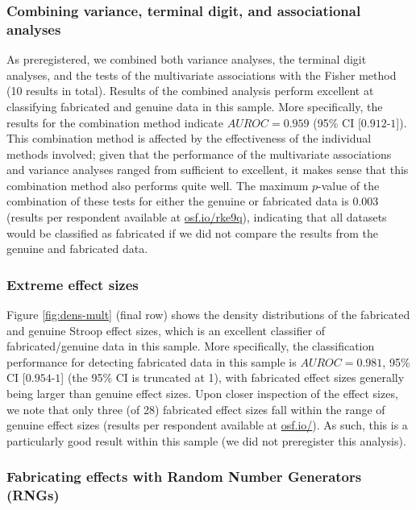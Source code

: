 \documentclass[a5paper]{book}
\begin{document}
\subsubsection{Combining variance, terminal digit, and associational
analyses}\label{combining-variance-terminal-digit-and-associational-analyses}

As preregistered, we combined both variance analyses, the terminal digit
analyses, and the tests of the multivariate associations with the Fisher
method (10 results in total). Results of the combined analysis perform
excellent at classifying fabricated and genuine data in this sample.
More specifically, the results for the combination method indicate
\(AUROC=0.959\) (95\% CI {[}\(0.912\)-\(1\){]}). This combination method
is affected by the effectiveness of the individual methods involved;
given that the performance of the multivariate associations and variance
analyses ranged from sufficient to excellent, it makes sense that this
combination method also performs quite well. The maximum \(p\)-value of
the combination of these tests for either the genuine or fabricated data
is 0.003 (results per respondent available at
\href{https://osf.io/rke9q}{osf.io/rke9q}), indicating that all datasets
would be classified as fabricated if we did not compare the results from
the genuine and fabricated data.

\subsubsection{Extreme effect sizes}\label{extreme-effect-sizes-2}

Figure \ref{fig:dens-mult} (final row) shows the density distributions
of the fabricated and genuine Stroop effect sizes, which is an excellent
classifier of fabricated/genuine data in this sample. More specifically,
the classification performance for detecting fabricated data in this
sample is \(AUROC=0.981\), 95\% CI {[}\(0.954\)-\(1\){]} (the 95\% CI is
truncated at 1), with fabricated effect sizes generally being larger
than genuine effect sizes. Upon closer inspection of the effect sizes,
we note that only three (of 28) fabricated effect sizes fall within the
range of genuine effect sizes (results per respondent available at
\href{https://osf.io/}{osf.io/}). As such, this is a particularly good
result within this sample (we did not preregister this analysis).

\subsubsection{Fabricating effects with Random Number Generators
(RNGs)}\label{fabricating-effects-with-random-number-generators-rngs-1}
\end{document}
